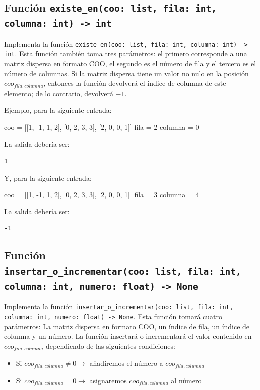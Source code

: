 \documentclass[10pt,a4paper]{article}
\begin{document}
\subsection*{Función \lstinline|existe_en(coo: list, fila: int, columna: int) -> int|}
Implementa la función \lstinline|existe_en(coo: list, fila: int, columna: int) -> int|. Esta función también toma tres parámetros: el primero corresponde a una matriz dispersa en formato COO, el segundo es el número de fila y el tercero es el número de columnas. Si la matriz dispersa tiene un valor no nulo en la posición $coo_{fila, columna}$, entonces la función devolverá el índice de columna de este elemento; de lo contrario, devolverá $-1$.

Ejemplo, para la siguiente entrada:

\begin{attachedlisting}[sparse4]
coo = [[1, -1, 1, 2],
       [0, 2, 3, 3],
       [2, 0, 0, 1]]
fila = 2
columna = 0
\end{attachedlisting}

La salida debería ser:
\begin{lstlisting}
1
\end{lstlisting}

Y, para la siguiente entrada:

\begin{attachedlisting}[sparse5]
coo = [[1, -1, 1, 2],
       [0, 2, 3, 3],
       [2, 0, 0, 1]]
fila = 3
columna = 4
\end{attachedlisting}

La salida debería ser:
\begin{lstlisting}
-1
\end{lstlisting}

\newpage
\subsection*{Función \\ \lstinline|insertar_o_incrementar(coo: list, fila: int, columna: int, numero: float) -> None|}
Implementa la función \lstinline|insertar_o_incrementar(coo: list, fila: int, columna: int, numero: float) -> None|. Esta función tomará cuatro parámetros: La matriz dispersa en formato COO, un índice de fila, un índice de columna y un número. La función insertará o incrementará el valor contenido en $coo_{fila,columna}$ dependiendo de las siguientes condiciones:
\begin{itemize}
\item Si $coo_{fila,columna} \neq 0 \rightarrow$ añadiremos el número a $coo_{fila,columna}$
\item Si $coo_{fila,columna} = 0 \rightarrow$ asignaremos $coo_{fila,columna}$ al número
\end{itemize}
\end{document}
